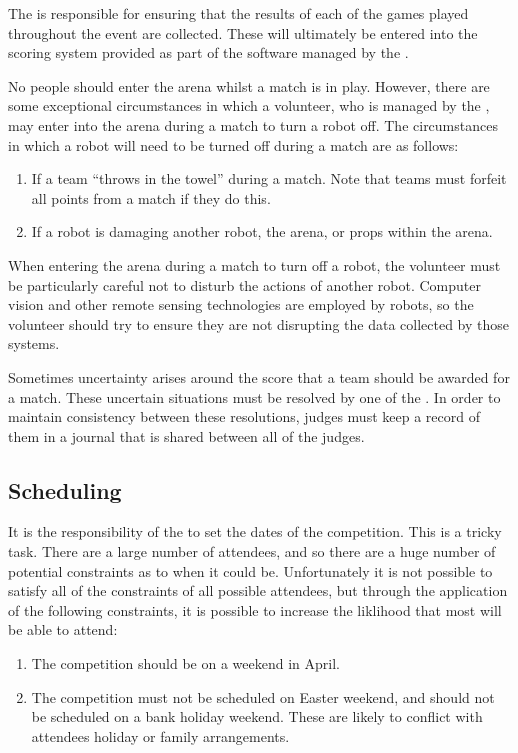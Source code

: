 The  is responsible for ensuring that the results of each of the games played throughout the event are collected.  These will ultimately be entered into the scoring system provided as part of the software managed by the .

No people should enter the arena whilst a match is in play.  However, there are some exceptional circumstances in which a volunteer, who is managed by the , may enter into the arena during a match to turn a robot off.  The circumstances in which a robot will need to be turned off during a match are as follows:
\begin{enumerate}
\item If a team ``throws in the towel'' during a match.  Note that teams must forfeit all points from a match if they do this.
\item If a robot is damaging another robot, the arena, or props within the arena.
\end{enumerate}
When entering the arena during a match to turn off a robot, the volunteer must be particularly careful not to disturb the actions of another robot.  Computer vision and other remote sensing technologies are employed by robots, so the volunteer should try to ensure they are not disrupting the data collected by those systems.

Sometimes uncertainty arises around the score that a team should be awarded for a match.  These uncertain situations must be resolved by one of the .  In order to maintain consistency between these resolutions, judges must keep a record of them in a journal that is shared between all of the judges.

\subsection{Scheduling}

It is the responsibility of the  to set the dates of the competition.  This is a tricky task.  There are a large number of attendees, and so there are a huge number of potential constraints as to when it could be.  Unfortunately it is not possible to satisfy all of the constraints of all  possible attendees, but through the application of the following constraints, it is possible to increase the liklihood that most will be able to attend:
\begin{enumerate}
\item The competition should be on a weekend in April.
\item The competition must not be scheduled on Easter weekend, and should not be scheduled on a bank holiday weekend.  These are likely to conflict with attendees holiday or family arrangements.
\end{enumerate}

